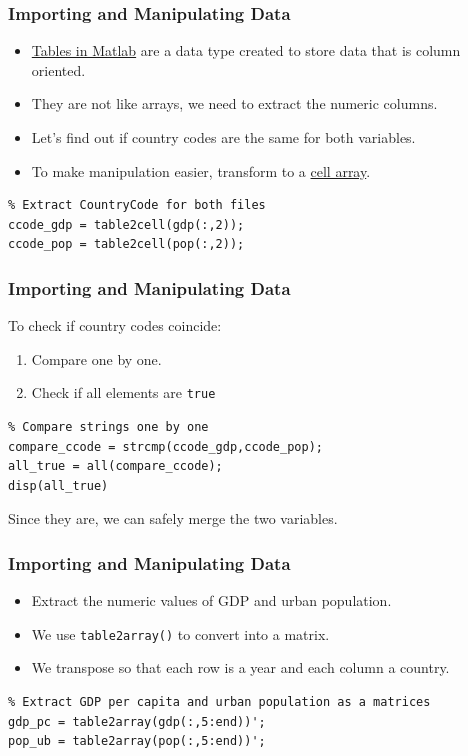\documentclass[11pt,xcolor={svgnames},aspectratio=169,usepdftitle=false]{beamer}
\begin{document}
\begin{frame}[fragile]
  \frametitle{Importing and Manipulating Data}
\begin{itemize}
  \item \href{https://www.mathworks.com/help/matlab/tables.html}{Tables in Matlab} are a data type created to store data that is column oriented.
  \item They are not like arrays, we need to extract the numeric columns.
  \item Let's find out if country codes are the same for both variables.
  \item To make manipulation easier, transform to a \href{https://www.mathworks.com/help/matlab/ref/cell.html}{cell array}.
\end{itemize}
\begin{lstlisting}
% Extract CountryCode for both files
ccode_gdp = table2cell(gdp(:,2));
ccode_pop = table2cell(pop(:,2));
\end{lstlisting}
\end{frame}

\begin{frame}[fragile]
  \frametitle{Importing and Manipulating Data}
  To check if country codes coincide:
  \begin{enumerate}
    \item Compare one by one.
    \item Check if all elements are \verb;true;
  \end{enumerate}
\begin{lstlisting}
% Compare strings one by one
compare_ccode = strcmp(ccode_gdp,ccode_pop);
all_true = all(compare_ccode);
disp(all_true)
\end{lstlisting}
Since they are, we can safely merge the two variables.
\end{frame}

\begin{frame}[fragile]
  \frametitle{Importing and Manipulating Data}
\begin{itemize}
  \item Extract the numeric values of GDP and urban population.
  \item We use \verb;table2array(); to convert into a matrix.
  \item We transpose so that each row is a year and each column a country.
\end{itemize}
\begin{lstlisting}
% Extract GDP per capita and urban population as a matrices
gdp_pc = table2array(gdp(:,5:end))';
pop_ub = table2array(pop(:,5:end))';
\end{lstlisting}
\end{frame}
\end{document}

